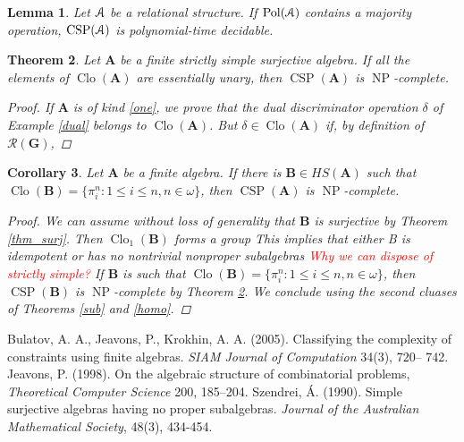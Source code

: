 \documentclass{amsart}
\theoremstyle{plain}
\newtheorem{theorem}{Theorem}[section]
\newtheorem{corollary}[theorem]{Corollary}
\newtheorem{lemma}[theorem]{Lemma}
\theoremstyle{definition}
\theoremstyle{remark}
\DeclareMathOperator{\Clo}{Clo}
\DeclareMathOperator{\CSP}{CSP}
\DeclareMathOperator{\Pol}{Pol}
\DeclareMathOperator{\NP}{NP}
\begin{document}
\begin{lemma}
    Let $\EuScript{A}$ be a relational structure. 
    If $\Pol(\EuScript{A})$ contains a majority operation, $\CSP(\EuScript{\EuScript{A}})$ is polynomial-time decidable. 
\end{lemma}

\begin{theorem}
    \label{ess-unary}
    Let $\mathbf{A}$ be a finite strictly simple surjective algebra.
    If all the elements of $\Clo(\mathbf{A})$ are essentially unary, then $\CSP(\mathbf{A})$ is $\NP$-complete. 
    \begin{proof}
        If $\mathbf{A}$ is of kind \eqref{one}, we prove that the dual discriminator operation $\delta$ of Example \ref{dual} belongs to $\Clo(\mathbf{A})$. 
        But $\delta \in \Clo(\mathbf{A})$ if, by definition of $\mathcal{R}(\mathbf{G})$, 

    \end{proof}
\end{theorem}

\begin{corollary}
    Let $\mathbf{A}$ be a finite 
    algebra. 
    If there is $\mathbf{B} \in HS(\mathbf{A})$ such that $\Clo(\mathbf{B}) = \{\pi^n_i: 1 \le i \le n, n \in \omega\}$, then 
    $\CSP(\mathbf{A})$ is $\NP$-complete. 
    \begin{proof}
        We can assume without loss of generality that $\mathbf{B}$ is surjective by Theorem \ref{thm_surj}. 
        Then $\Clo_1(\mathbf{B})$ forms a group 
        This implies that either B is idempotent or has no nontrivial nonproper subalgebras 
        \textcolor{red}{Why we can dispose of strictly simple?}
        If $\mathbf{B}$ is such that $\Clo(\mathbf{B}) = \{\pi^n_i: 1 \le i \le n, n \in \omega\}$, then $\CSP(\mathbf{B})$ is $\NP$-complete by Theorem \ref{ess-unary}. 
        We conclude using the second cluases of Theorems \ref{sub} and \ref{homo}. 
   \end{proof}
\end{corollary}





\begin{thebibliography}{9}
    Bulatov, A. A.,  Jeavons, P., Krokhin, A. A. (2005). Classifying the complexity of constraints using finite algebras. \emph{SIAM Journal of Computation} 34(3), 720– 742.
    Jeavons, P. (1998). On the algebraic structure of combinatorial problems, \emph{Theoretical Computer Science} 200, 185–204.
    Szendrei, Á. (1990). Simple surjective algebras having no proper subalgebras. \emph{Journal of the Australian Mathematical Society}, 48(3), 434-454. 
 \end{thebibliography}
\end{document}
